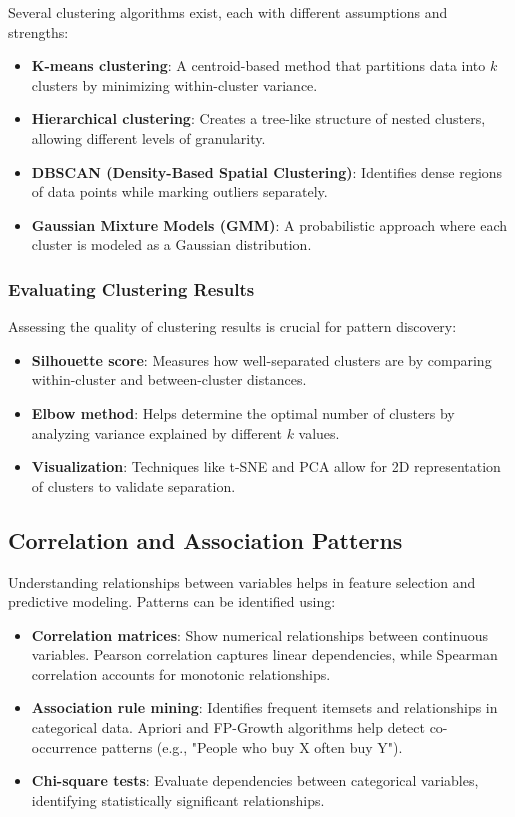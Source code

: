\documentclass[12pt,openany]{book}
\begin{document}
Several clustering algorithms exist, each with different assumptions and strengths:
\begin{itemize}
    \item \textbf{K-means clustering}: A centroid-based method that partitions data into \( k \) clusters by minimizing within-cluster variance.
    \item \textbf{Hierarchical clustering}: Creates a tree-like structure of nested clusters, allowing different levels of granularity.
    \item \textbf{DBSCAN (Density-Based Spatial Clustering)}: Identifies dense regions of data points while marking outliers separately.
    \item \textbf{Gaussian Mixture Models (GMM)}: A probabilistic approach where each cluster is modeled as a Gaussian distribution.
\end{itemize}

\subsubsection{Evaluating Clustering Results}

Assessing the quality of clustering results is crucial for pattern discovery:
\begin{itemize}
    \item \textbf{Silhouette score}: Measures how well-separated clusters are by comparing within-cluster and between-cluster distances.
    \item \textbf{Elbow method}: Helps determine the optimal number of clusters by analyzing variance explained by different \( k \) values.
    \item \textbf{Visualization}: Techniques like t-SNE and PCA allow for 2D representation of clusters to validate separation.
\end{itemize}

\subsection{Correlation and Association Patterns}

Understanding relationships between variables helps in feature selection and predictive modeling. Patterns can be identified using:
\begin{itemize}
    \item \textbf{Correlation matrices}: Show numerical relationships between continuous variables. Pearson correlation captures linear dependencies, while Spearman correlation accounts for monotonic relationships.
    \item \textbf{Association rule mining}: Identifies frequent itemsets and relationships in categorical data. Apriori and FP-Growth algorithms help detect co-occurrence patterns (e.g., "People who buy X often buy Y").
    \item \textbf{Chi-square tests}: Evaluate dependencies between categorical variables, identifying statistically significant relationships.
\end{itemize}
\end{document}

